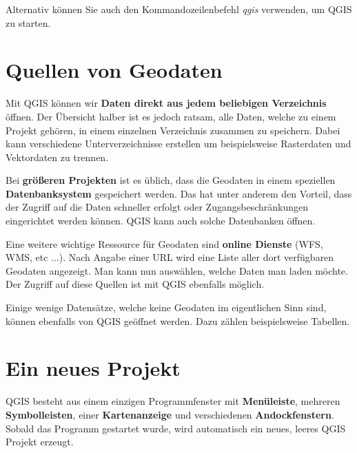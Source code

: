 \documentclass[a4paper,12pt,ngerman]{sphinxmanual}
\begin{document}
Alternativ können Sie auch den Kommandozeilenbefehl \emph{qgis} verwenden, um QGIS zu starten.


\section{Quellen von Geodaten}
\label{uebung2:quellen-von-geodaten}
Mit QGIS können wir \textbf{Daten direkt aus jedem beliebigen Verzeichnis} öffnen. Der Übersicht halber ist es jedoch ratsam, alle Daten, welche zu einem Projekt gehören, in einem einzelnen Verzeichnis zusammen zu speichern.
Dabei kann verschiedene Unterverzeichnisse erstellen um beispielsweise Rasterdaten und Vektordaten zu trennen.

Bei \textbf{größeren Projekten} ist es üblich, dass die Geodaten in einem speziellen \textbf{Datenbanksystem} gespeichert werden. Das hat unter anderem den Vorteil, dass der Zugriff auf die Daten schneller erfolgt oder Zugangsbeschränkungen eingerichtet werden können. QGIS kann auch solche Datenbanken öffnen.

Eine weitere wichtige Ressource für Geodaten sind \textbf{online Dienste} (WFS, WMS, etc ...). Nach Angabe einer URL wird eine Liste aller dort verfügbaren Geodaten angezeigt. Man kann nun auswählen, welche Daten man laden möchte. Der Zugriff auf diese Quellen ist mit QGIS ebenfalls möglich.

Einige wenige Datensätze, welche keine Geodaten im eigentlichen Sinn sind, können ebenfalls von QGIS geöffnet werden. Dazu zählen beispielsweise Tabellen.


\section{Ein neues Projekt}
\label{uebung2:ein-neues-projekt}
QGIS besteht aus einem einzigen Programmfenster mit \textbf{Menüleiste}, mehreren \textbf{Symbolleisten}, einer \textbf{Kartenanzeige} und verschiedenen \textbf{Andockfenstern}.
Sobald das Programm gestartet wurde, wird automatisch ein neues, leeres QGIS Projekt erzeugt.
\end{document}
